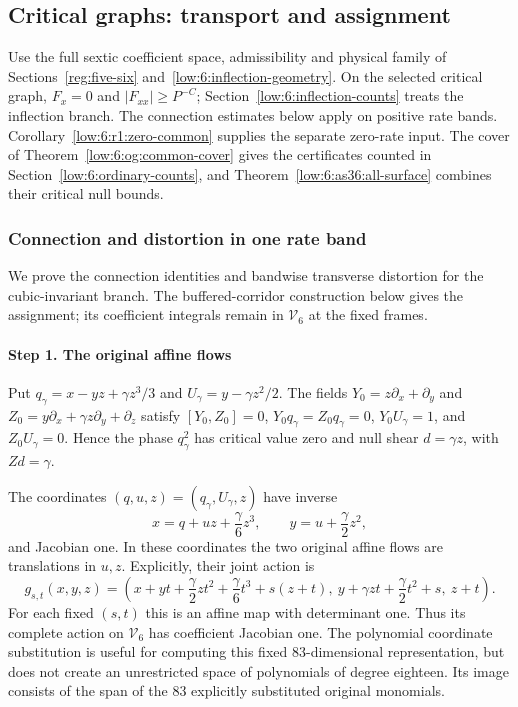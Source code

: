 \documentclass[11pt]{amsart}
\theoremstyle{definition}
\theoremstyle{remark}
\numberwithin{equation}{section}
\begin{document}
\subsection{Critical graphs: transport and assignment}\label{low:degree6:ordinary}\label{low:6:ordinary-connection}\label{low:6:s36cg:section}\label{low:6:ordinary-cover}\label{low:6:as36:relocation-section}\label{low:6:r3:band-summation}\label{low:6:og:cover}

Use the full sextic coefficient space, admissibility and physical family of Sections~\ref{reg:five-six} and~\ref{low:6:inflection-geometry}. On the selected critical graph, $F_x=0$ and $|F_{xx}|\ge P^{-C}$; Section~\ref{low:6:inflection-counts} treats the inflection branch. The connection estimates below apply on positive rate bands. Corollary~\ref{low:6:r1:zero-common} supplies the separate zero-rate input. The cover of Theorem~\ref{low:6:og:common-cover} gives the certificates counted in Section~\ref{low:6:ordinary-counts}, and Theorem~\ref{low:6:as36:all-surface} combines their critical null bounds.

\subsubsection{Connection and distortion in one rate band}

We prove the connection identities and bandwise transverse distortion for the cubic-invariant branch. The buffered-corridor construction below gives the assignment; its coefficient integrals remain in $\mathcal V_6$ at the fixed frames.

\paragraph{Step 1. The original affine flows}

Put $q_\gamma=x-yz+\gamma z^3/3$ and $U_\gamma=y-\gamma z^2/2$. The fields $Y_0=z\partial_x+\partial_y$ and $Z_0=y\partial_x+\gamma z\partial_y+\partial_z$ satisfy $[Y_0,Z_0]=0$, $Y_0q_\gamma=Z_0q_\gamma=0$, $Y_0U_\gamma=1$, and $Z_0U_\gamma=0$. Hence the phase $q_\gamma^2$ has critical value zero and null shear $d=\gamma z$, with $Z d=\gamma$. 

The coordinates $(q,u,z)=(q_\gamma,U_\gamma,z)$ have inverse
\[
x=q+uz+\frac{\gamma}{6}z^3,\qquad y=u+\frac{\gamma}{2}z^2,
\]
and Jacobian one. In these coordinates the two original affine flows are translations in $u,z$. Explicitly, their joint action is
\[
g_{s,t}(x,y,z)=\left(x+yt+\frac{\gamma}{2}zt^2+\frac{\gamma}{6}t^3+s(z+t),\ y+\gamma zt+\frac{\gamma}{2}t^2+s,\ z+t\right).
\]
For each fixed $(s,t)$ this is an affine map with determinant one. Thus its complete action on $\mathcal V_6$ has coefficient Jacobian one. The polynomial coordinate substitution is useful for computing this fixed $83$-dimensional representation, but does not create an unrestricted space of polynomials of degree eighteen. Its image consists of the span of the $83$ explicitly substituted original monomials.
\end{document}
